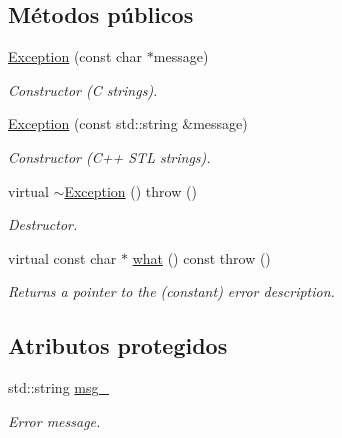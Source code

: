 \subsection*{Métodos públicos}
\begin{DoxyCompactItemize}
\item 
\hyperlink{classException_ac541ead5c20548813d7dea73c28c7fab}{Exception} (const char $\ast$message)
\begin{DoxyCompactList}\small\item\em Constructor (C strings). \end{DoxyCompactList}\item 
\hyperlink{classException_a472b7904dadf1047ba48c23741888456}{Exception} (const std\+::string \&message)
\begin{DoxyCompactList}\small\item\em Constructor (C++ S\+TL strings). \end{DoxyCompactList}\item 
virtual \hyperlink{classException_ad1ba411de295ef2eeb02ba26284a829a}{$\sim$\+Exception} ()  throw ()
\begin{DoxyCompactList}\small\item\em Destructor. \end{DoxyCompactList}\item 
virtual const char $\ast$ \hyperlink{classException_a78154a31544a609cbd226d32574f52cd}{what} () const   throw ()
\begin{DoxyCompactList}\small\item\em Returns a pointer to the (constant) error description. \end{DoxyCompactList}\end{DoxyCompactItemize}
\subsection*{Atributos protegidos}
\begin{DoxyCompactItemize}
\item 
std\+::string \hyperlink{classException_a5d59cc46086c61391ed26773ce861780}{msg\+\_\+}\hypertarget{classException_a5d59cc46086c61391ed26773ce861780}{}\label{classException_a5d59cc46086c61391ed26773ce861780}

\begin{DoxyCompactList}\small\item\em Error message. \end{DoxyCompactList}\end{DoxyCompactItemize}


